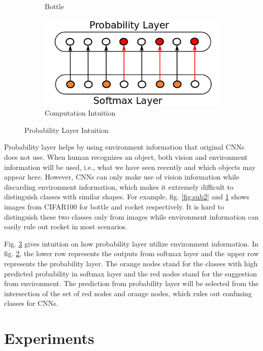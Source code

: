 \documentclass{article}
\begin{document}
\begin{figure}[t]
\begin{subfigure}{.25\textwidth}
  \caption{Bottle}
  \label{fig:sub3}
\end{subfigure}
\begin{subfigure}{.45\textwidth}
  \centering
  \includegraphics[width=\textwidth]{intuition.png}
  \caption{Computation Intuition}
  \label{fig:sub1}
\end{subfigure}

\caption{Probability Layer Intuition}
\label{fig:intuition}
\end{figure}


Probability layer helps by using environment information that original CNNs does not use. When human recognizes an object, both vision and environment information will be used, i.e., what we have seen recently and which objects may appear here. However, CNNs can only make use of vision information while discarding environment information, which makes it extremely difficult to distinguish classes with similar shapes. For example, fig. \ref{fig:sub2} and \ref{fig:sub3} shows images from CIFAR100 for bottle and rocket respectively. It is hard to distinguish these two classes only from images while environment information can easily rule out rocket in most scenarios. 

Fig. \ref{fig:intuition} gives intuition on how probability layer utilize environment information. In fig. \ref{fig:sub1}, the lower row represents the outputs from softmax layer and the upper row represents the probability layer. The orange nodes stand for the classes with high predicted probability in softmax layer and the red nodes stand for the suggestion from environment. The prediction from probability layer will be selected from the intersection of the set of red nodes and orange nodes, which rules out confusing classes for CNNs. 


\section{Experiments}
\end{document}

